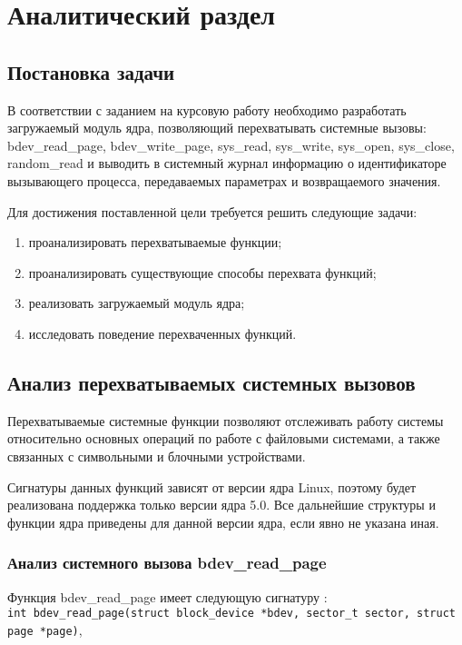\chapter{Аналитический раздел}
	\section{Постановка задачи}
		В соответствии с заданием на курсовую работу
		необходимо разработать загружаемый модуль ядра,
	 	позволяющий перехватывать системные вызовы:
		bdev\_read\_page,
		bdev\_write\_page,
		sys\_read,
		sys\_write,
		sys\_open,
		sys\_close,
		random\_read и выводить в системный журнал информацию о 
		идентификаторе вызывающего процесса, 
		передаваемых параметрах и возвращаемого значения.

		Для достижения поставленной цели требуется решить следующие задачи:
		\begin{enumerate}
			\item проанализировать перехватываемые функции;
			\item проанализировать существующие способы перехвата функций;
			\item реализовать загружаемый модуль ядра;
			\item исследовать поведение перехваченных функций.
		\end{enumerate}
	
	\section{Анализ перехватываемых системных вызовов}
		Перехватываемые системные функции позволяют 
		отслеживать работу системы относительно 
		основных операций по работе с файловыми системами,
		а также связанных с символьными и блочными устройствами.

		Сигнатуры данных функций зависят от версии ядра Linux, 
		поэтому будет реализована поддержка только версии ядра 5.0.
		Все дальнейшие структуры и функции ядра приведены для данной версии ядра, 
		если явно не указана иная.
		
	\subsection*{Анализ системного вызова bdev\_read\_page}
		Функция bdev\_read\_page имеет следующую сигнатуру \cite{linux-bdev_read_page}:\\
		\lstinline{int bdev_read_page(struct block_device *bdev, sector_t sector, struct page *page)},

